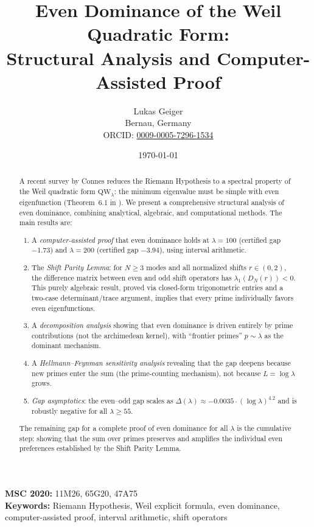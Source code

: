 \documentclass[12pt,a4paper]{article}
\title{Even Dominance of the Weil Quadratic Form:\\
Structural Analysis and Computer-Assisted Proof}
\author{Lukas Geiger\\
\small Bernau, Germany\\
\small ORCID: \href{https://orcid.org/0009-0005-7296-1534}{0009-0005-7296-1534}}
\date{\today}
\theoremstyle{definition}
\theoremstyle{remark}
\begin{document}
\maketitle

\begin{abstract}
A recent survey by Connes reduces the Riemann Hypothesis to a spectral property of the Weil quadratic form $\mathrm{QW}_\lambda$: the minimum eigenvalue must be simple with even eigenfunction (Theorem~6.1 in \cite{Connes2025}). We present a comprehensive structural analysis of even dominance, combining analytical, algebraic, and computational methods. The main results are:
\begin{enumerate}[label=(\roman*)]
  \item A \emph{computer-assisted proof} that even dominance holds at $\lambda = 100$ (certified gap $-1.73$) and $\lambda = 200$ (certified gap $-3.94$), using interval arithmetic.
  \item The \emph{Shift Parity Lemma}: for $N \geq 3$ modes and all normalized shifts $r \in (0,2)$, the difference matrix between even and odd shift operators has $\lambda_1(D_N(r)) < 0$. This purely algebraic result, proved via closed-form trigonometric entries and a two-case determinant/trace argument, implies that every prime individually favors even eigenfunctions.
  \item A \emph{decomposition analysis} showing that even dominance is driven entirely by prime contributions (not the archimedean kernel), with ``frontier primes'' $p \sim \lambda$ as the dominant mechanism.
  \item A \emph{Hellmann--Feynman sensitivity analysis} revealing that the gap deepens because new primes enter the sum (the prime-counting mechanism), not because $L = \log\lambda$ grows.
  \item \emph{Gap asymptotics}: the even--odd gap scales as $\Delta(\lambda) \approx -0.0035 \cdot (\log\lambda)^{4.2}$ and is robustly negative for all $\lambda \geq 55$.
\end{enumerate}
The remaining gap for a complete proof of even dominance for all $\lambda$ is the cumulative step: showing that the sum over primes preserves and amplifies the individual even preferences established by the Shift Parity Lemma.
\end{abstract}

\noindent\textbf{MSC 2020:} 11M26, 65G20, 47A75\\
\textbf{Keywords:} Riemann Hypothesis, Weil explicit formula, even dominance, computer-assisted proof, interval arithmetic, shift operators
\end{document}
